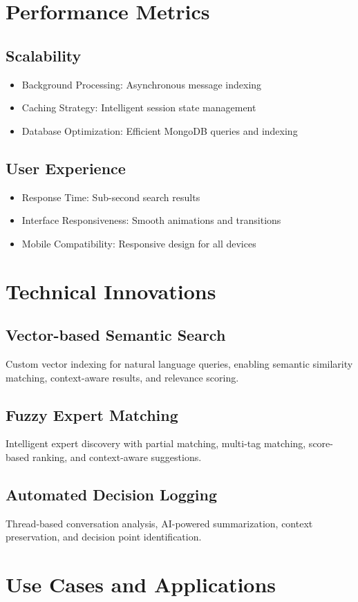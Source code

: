 \documentclass[12pt,a4paper]{article}
\begin{document}
\section{Performance Metrics}
\subsection{Scalability}
\begin{itemize}
    \item Background Processing: Asynchronous message indexing
    \item Caching Strategy: Intelligent session state management
    \item Database Optimization: Efficient MongoDB queries and indexing
\end{itemize}
\subsection{User Experience}
\begin{itemize}
    \item Response Time: Sub-second search results
    \item Interface Responsiveness: Smooth animations and transitions
    \item Mobile Compatibility: Responsive design for all devices
\end{itemize}
\section{Technical Innovations}
\subsection{Vector-based Semantic Search}
Custom vector indexing for natural language queries, enabling semantic similarity matching, context-aware results, and relevance scoring.
\subsection{Fuzzy Expert Matching}
Intelligent expert discovery with partial matching, multi-tag matching, score-based ranking, and context-aware suggestions.
\subsection{Automated Decision Logging}
Thread-based conversation analysis, AI-powered summarization, context preservation, and decision point identification.
\section{Use Cases and Applications}
\end{document}
